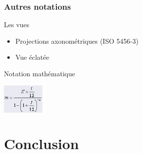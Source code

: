 \documentclass{beamer}
\begin{document}
\begin{frame}  
  \frametitle {Autres notations}
  \begin{block}{Les vues}
  \begin{itemize}
  \item Projections axonométriques (ISO 5456-3)
  \item Vue éclatée
  \end{itemize}
  \end{block}
  \begin{block}{Notation mathématique}
  \begin{center}
  \includegraphics[height=1.5cm]{./include/formule.jpg}
  \end{center}
  \end{block}
\end{frame}

\section{Conclusion}
\end{document}
